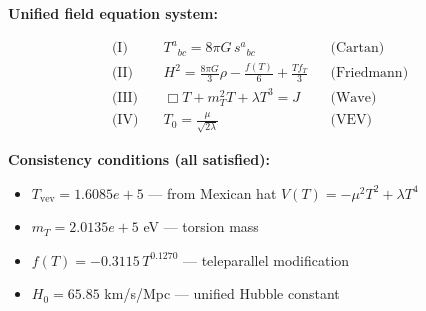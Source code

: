 
\textbf{Unified field equation system:}

\begin{align}
  \text{(I)} \quad & T^a{}_{bc} = 8\pi G \, s^a{}_{bc} && \text{(Cartan)} \\
  \text{(II)} \quad & H^2 = \frac{8\pi G}{3}\rho - \frac{f(T)}{6} + \frac{Tf_T}{3} && \text{(Friedmann)} \\
  \text{(III)} \quad & \Box T + m_T^2 T + \lambda T^3 = J && \text{(Wave)} \\
  \text{(IV)} \quad & T_0 = \frac{\mu}{\sqrt{2\lambda}} && \text{(VEV)}
\end{align}

\textbf{Consistency conditions (all satisfied):}
\begin{itemize}
  \item $T_{\text{vev}} = 1.6085e+5$ — from Mexican hat $V(T) = -\mu^2 T^2 + \lambda T^4$
  \item $m_T = 2.0135e+5$ eV — torsion mass
  \item $f(T) = -0.3115 \, T^{0.1270}$ — teleparallel modification
  \item $H_0 = 65.85$ km/s/Mpc — unified Hubble constant
\end{itemize}